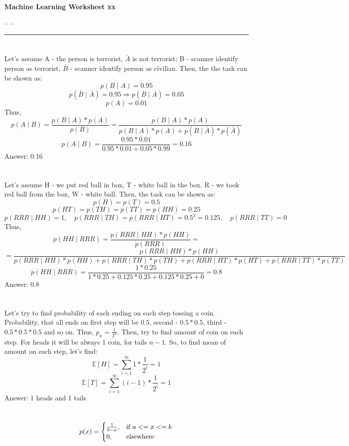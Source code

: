 \documentclass[11pt]{article}
\newcommand{\exercise}{\section{}}
\newcommand{\hwhead}[4]{
\begin{center}
\sffamily\large\bfseries Machine Learning Worksheet #1
\vspace{2mm} 
\normalfont

#2 -- #3 -- \texttt{#4}
\end{center}
\vspace{6mm} \hrule \vspace{4mm}
}
\newcommand{\name}{} %
\newcommand{\imat}{} %
\newcommand{\email}{} %
\begin{document}
\hwhead{xx}{\name}{\imat}{\email}


\exercise %

Let's assume A - the person is terrorist, $\bar{A}$  is not terrorist; B - scanner identify person as terrorist, $\bar{B}$ - scanner identify person as civilian. \newline
Then, the the task can be shown as:\newline
$$ p(B\mid A) = 0.95 $$
$$p(\bar{B}\mid \bar{A}) = 0.95  \Rightarrow   p(B \mid  \bar{A} ) = 0.05 $$ 
$$ p(A) = 0.01 $$ 
Thus, 
$$p(A\mid B) = \frac{p(B\mid A)*p(A)}{p(B)} = \frac{p(B\mid A)*p(A)}{p(B\mid A)*p(A)+p(B\mid \bar{A})*p(\bar{A})} $$
$$p(A\mid B) = \frac{0.95*0.01}{0.95*0.01+0.05*0.99}=0.16$$
Answer: 0.16


\exercise
Let's assume H - we put red ball in box, T - white ball in the box. R - we took red ball from the box, W - white ball. Then, the task can be shown as:
$$p(H) = p(T) = 0.5$$
$$p(HT) = p(TH) = p(TT)= p(HH)= 0.25$$
$$p(RRR\mid HH) = 1,\quad p(RRR\mid TH) = p(RRR\mid HT) = 0.5^3 = 0.125,\quad p(RRR\mid TT) = 0$$
Thus, 
$$p(HH\mid RRR) = \frac{p(RRR\mid HH)*p(HH)}{p(RRR)}=$$
$$= \frac{p(RRR\mid HH)*p(HH)}{p(RRR\mid HH)*p(HH)+p(RRR\mid TH)*p(TH)+p(RRR\mid HT)*p(HT)+p(RRR\mid TT)*p(TT)} $$
$$p(HH\mid RRR) = \frac{1*0.25}{1*0.25+0.125*0.25+0.125*0.25+0}=0.8$$
Answer: 0.8


\exercise
Let's try to find probability of each ending on each step tossing a coin. Probability, that all ends on first step will be $0.5$, second - $0.5*0.5$, third - $0.5*0.5*0.5$ and so on. Thus, ${p}_{n}=\frac{1}{2^n} $. Then, try to find amount of coin on each step. For heads it will be always 1 coin, for tails $n-1$.
So, to find mean of amount on each step, let's find:
$$\mathbb{E}[H] = \sum_{i=1}^{\infty}1*\frac{1}{2^i}=1$$
$$\mathbb{E}[T] = \sum_{i=1}^{\infty}(i-1)*\frac{1}{2^i}=1$$
Answer: 1 heads and 1 tails


\exercise
\begin{equation}
\begin{split}
p(x) = \begin{cases}\frac{1}{b-a}, & \mbox{if } a<=x<=b \\ 0, & \mbox{elsewhere} \end{cases} \newline
\end{split}
\end{equation}
\end{document}
